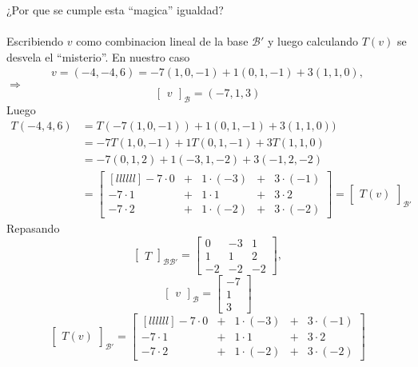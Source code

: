 \documentclass{article}
\theoremstyle{definition}
\theoremstyle{definition}
\theoremstyle{remark}
\begin{document}
¿Por que se cumple esta ``magica'' igualdad? \\\\ Escribiendo $v$ como combinacion lineal de la base $\mathcal{B}'$ y luego calculando $T(v)$ se desvela el ``misterio''. En nuestro caso \[
  \begin{aligned}
v =(-4,-4,6)=-7(1,0,-1)+1(0,1,-1)+3(1,1,0), 
\end{aligned}\]
  $\Rightarrow$ \[
    \begin{bmatrix}v \end{bmatrix}_{\mathcal{B}}=(-7,1,3)
  \]
  Luego
  \[
    \begin{aligned}
      T(-4,4,6) &= T(-7(1,0,-1))+1(0,1,-1)+3(1,1,0)) \\
                &= -7T(1,0,-1)+1T(0,1,-1)+3T(1,1,0) \\
                &= -7(0,1,2)+1(-3,1,-2)+3(-1,2,-2) \\
                &= \begin{bmatrix}[llllll] -7 \cdot 0 & + & 1 \cdot (-3) & +& 3 \cdot (-1) \\ -7 \cdot 1 & +& 1 \cdot 1 & +& 3 \cdot 2 \\ -7 \cdot 2 & + & 1 \cdot (-2) & + & 3 \cdot (-2) \end{bmatrix} = \begin{bmatrix} T (v) \end{bmatrix}_{\mathcal{B'}}
    \end{aligned}
  \]
  Repasando \[
    \begin{bmatrix}
T
\end{bmatrix}_{\mathcal{B}\mathcal{B'}}=\begin{bmatrix}0 & -3 & 1 \\ 1 & 1 & 2 \\ -2 & -2 & -2 \end{bmatrix},
  \]
  \[
    \begin{bmatrix}v\end{bmatrix}_{\mathcal{B}}=\begin{bmatrix}-7 \\ 1 \\ 3 \end{bmatrix}
    \]\[
\begin{bmatrix} T (v) \end{bmatrix}_{\mathcal{B'}}
= \begin{bmatrix}[llllll] -7 \cdot 0 & + & 1 \cdot (-3) & +& 3 \cdot (-1) \\ -7 \cdot 1 & +& 1 \cdot 1 & +& 3 \cdot 2 \\ -7 \cdot 2 & + & 1 \cdot (-2) & + & 3 \cdot (-2) \end{bmatrix}   \]
\end{document}
